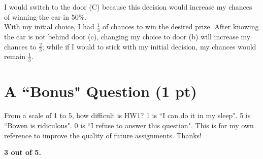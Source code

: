 \documentclass{assignment}
\begin{document}
\begin{problem}
\begin{enumerate}
    I would switch to the door (C) because this decision would increase my chances of winning the car in 50\%.\\

    With my initial choice, I had $\frac{1}{3}$ of chances to win the desired prize. After knowing the car is not behind door (c), changing my choice to door (b) will increase my chances to $\frac{2}{3}$; while if I would to stick with my initial decision, my chances would remain $\frac{1}{3}$.\\
\end{enumerate}

\section{A ``Bonus" Question (1 pt)}
\noindent From a scale of 1 to 5, how difficult is HW1? 1 is ``I can do it in my sleep". 5 is ``Bowen is ridiculous". 0 is ``I refuse to answer this question". This is for my own reference to improve the quality of future assignments. Thanks!

\textbf{3 out of 5.}
    
\end{problem}
\end{document}
